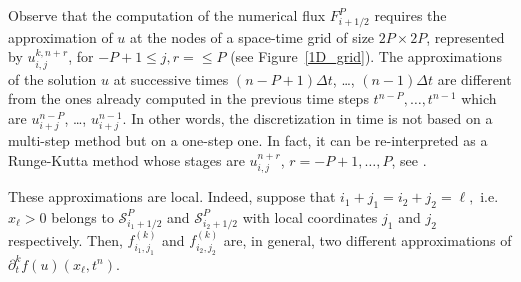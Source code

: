 \begin{rem}
    Observe that the computation of the numerical flux  $F_{i+1/2}^{P}$ requires the approximation of $u$ at the nodes of a space-time grid of size $2P \times 2P$, represented by $u_{i,j}^{k,n+r}$, for $-P+1 \leq j,r =\leq P$ (see Figure~\ref{1D_grid}). 
    The approximations of the solution $u$ at successive times $(n-P+1)\Delta t$, \dots, $(n-1)\Delta t$ are different from the ones  already computed in the previous time steps $t^{n-P},\ldots, t^{n-1}$ which are $u_{i+j}^{n-P}$, \ldots, $u_{i+j}^{n-1}$.  
    In other words, the discretization in time is not based on a multi-step method but on a one-step one. In fact, it can be re-interpreted as a Runge-Kutta method whose stages are $u^{n+r}_{i,j}$, $r = -P+1, \dots, P$, see \cite{Carrillo-Pares,CPZMR2020,Macca-Pares}.
\end{rem}
\begin{rem} \label{rem:local}
    These approximations are local. Indeed, suppose that $i_1+j_1 = i_2+j_2 = \ell,$ i.e. $x_{\ell}>0$ belongs to $\mathcal{S}^P_{i_1+1/2}$ and $\mathcal{S}^P_{i_2+1/2}$ with local coordinates $j_1$ and $j_2$ respectively. Then, $f^{(k)}_{i_1,j_1}$ and $f^{(k)}_{i_2,j_2}$ are, in general, two different approximations of $\partial_t^k f(u)(x_{\ell},t^n).$
\end{rem}


